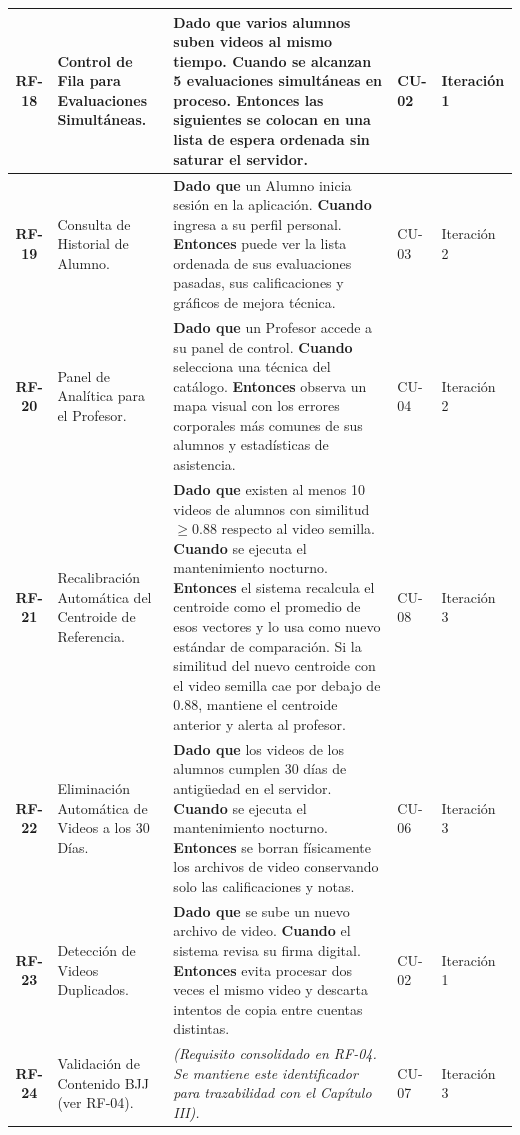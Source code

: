 \documentclass[12pt,letterpaper]{article}
\begin{document}
\begin{xltabular}{\textwidth}{|c|>{\raggedright\arraybackslash}p{0.22\textwidth}|>{\raggedright\arraybackslash}X|>{\centering\arraybackslash}p{0.12\textwidth}|>{\centering\arraybackslash}p{0.1\textwidth}|}
    \textbf{RF-18} & Control de Fila para Evaluaciones Simultáneas. & \textbf{Dado que} varios alumnos suben videos al mismo tiempo. \textbf{Cuando} se alcanzan 5 evaluaciones simultáneas en proceso. \textbf{Entonces} las siguientes se colocan en una lista de espera ordenada sin saturar el servidor. & CU-02 & Iteración 1 \\ \hline
    \textbf{RF-19} & Consulta de Historial de Alumno. & \textbf{Dado que} un Alumno inicia sesión en la aplicación. \textbf{Cuando} ingresa a su perfil personal. \textbf{Entonces} puede ver la lista ordenada de sus evaluaciones pasadas, sus calificaciones y gráficos de mejora técnica. & CU-03 & Iteración 2 \\ \hline
    \textbf{RF-20} & Panel de Analítica para el Profesor. & \textbf{Dado que} un Profesor accede a su panel de control. \textbf{Cuando} selecciona una técnica del catálogo. \textbf{Entonces} observa un mapa visual con los errores corporales más comunes de sus alumnos y estadísticas de asistencia. & CU-04 & Iteración 2 \\ \hline
    \textbf{RF-21} & Recalibración Automática del Centroide de Referencia. & \textbf{Dado que} existen al menos 10 videos de alumnos con similitud $\geq 0.88$ respecto al video semilla. \textbf{Cuando} se ejecuta el mantenimiento nocturno. \textbf{Entonces} el sistema recalcula el centroide como el promedio de esos vectores y lo usa como nuevo estándar de comparación. Si la similitud del nuevo centroide con el video semilla cae por debajo de 0.88, mantiene el centroide anterior y alerta al profesor. & CU-08 & Iteración 3 \\ \hline
    \textbf{RF-22} & Eliminación Automática de Videos a los 30 Días. & \textbf{Dado que} los videos de los alumnos cumplen 30 días de antigüedad en el servidor. \textbf{Cuando} se ejecuta el mantenimiento nocturno. \textbf{Entonces} se borran físicamente los archivos de video conservando solo las calificaciones y notas. & CU-06 & Iteración 3 \\ \hline
    \textbf{RF-23} & Detección de Videos Duplicados. & \textbf{Dado que} se sube un nuevo archivo de video. \textbf{Cuando} el sistema revisa su firma digital. \textbf{Entonces} evita procesar dos veces el mismo video y descarta intentos de copia entre cuentas distintas. & CU-02 & Iteración 1 \\ \hline
    \textbf{RF-24} & Validación de Contenido BJJ (ver RF-04). & \textit{(Requisito consolidado en RF-04. Se mantiene este identificador para trazabilidad con el Capítulo III).} & CU-07 & Iteración 3 \\ \hline
\end{xltabular}
\end{document}
